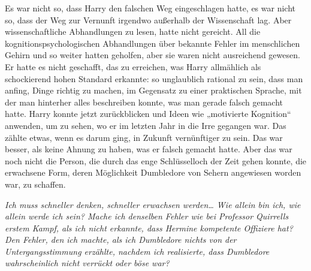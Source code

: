 Es war nicht so, dass Harry den falschen Weg eingeschlagen hatte, es war nicht so, dass der Weg zur Vernunft irgendwo außerhalb der Wissenschaft lag. Aber wissenschaftliche Abhandlungen zu lesen, hatte nicht gereicht. All die kognitionspsychologischen Abhandlungen über bekannte Fehler im menschlichen Gehirn und so weiter hatten geholfen, aber sie waren nicht ausreichend gewesen. Er hatte es nicht geschafft, das zu erreichen, was Harry allmählich als schockierend hohen Standard erkannte: so unglaublich rational zu sein, dass man anfing, Dinge richtig zu machen, im Gegensatz zu einer praktischen Sprache, mit der man hinterher alles beschreiben konnte, was man gerade falsch gemacht hatte. Harry konnte jetzt zurückblicken und Ideen wie „motivierte Kognition“ anwenden, um zu sehen, wo er im letzten Jahr in die Irre gegangen war. Das zählte etwas, wenn es darum ging, in Zukunft vernünftiger zu sein. Das war besser, als keine Ahnung zu haben, was er falsch gemacht hatte. Aber das war noch nicht die Person, die durch das enge Schlüsselloch der Zeit gehen konnte, die erwachsene Form, deren Möglichkeit Dumbledore von Sehern angewiesen worden war, zu schaffen.

\emph{Ich muss schneller denken, schneller erwachsen werden…
Wie allein bin ich, wie allein werde ich sein?
Mache ich denselben Fehler wie bei Professor Quirrells erstem Kampf, als ich nicht erkannte, dass Hermine kompetente Offiziere hat?
Den Fehler, den ich machte, als ich Dumbledore nichts von der Untergangsstimmung erzählte, nachdem ich realisierte, dass Dumbledore wahrscheinlich nicht verrückt oder böse war?}

